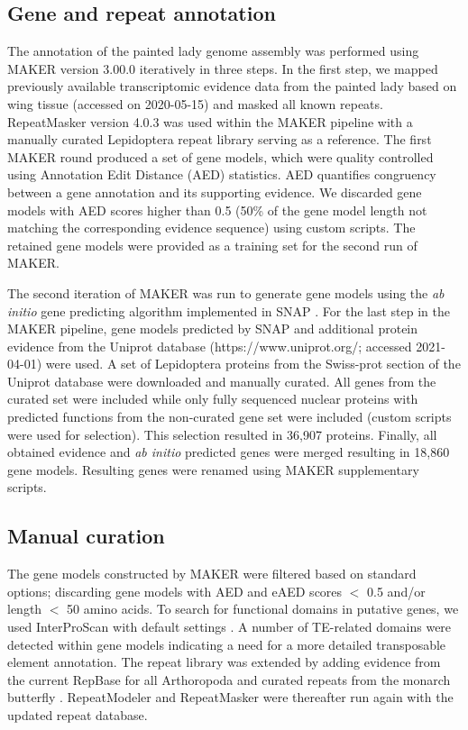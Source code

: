 \documentclass[twocolumn]{bmcart}%
\begin{document}
\subsection*{Gene and repeat annotation}
The annotation of the painted lady genome assembly was performed using MAKER version 3.00.0 \citep{holtMAKER2AnnotationPipeline2011} iteratively in three steps. In the first step, we mapped previously available transcriptomic evidence data from the painted lady based on wing tissue  \citep{connahsTranscriptomeAnalysisPainted2016a}(accessed on 2020-05-15) and masked all known repeats. RepeatMasker version 4.0.3 \citep{smitRepeatMaskerOpen42013} was used within the MAKER pipeline with a manually curated Lepidoptera repeat library  \citep{tallaRapidIncreaseGenome2017} serving as a reference. The first MAKER round produced a set of gene models, which were quality controlled using Annotation Edit Distance (AED) statistics. AED quantifies congruency between a gene annotation and its supporting evidence. We discarded gene models with AED scores higher than 0.5 (50\% of the gene model length not matching the corresponding evidence sequence) using custom scripts. The retained gene models were provided as a training set for the second run of MAKER.

The second iteration of MAKER was run to generate gene models using the \textit{ab initio} gene predicting algorithm implemented in SNAP \citep{korfGeneFindingNovel2004}. For the last step in the MAKER pipeline, gene models predicted by SNAP and additional protein evidence from the Uniprot database (https://www.uniprot.org/; accessed 2021-04-01) were used. A set of Lepidoptera proteins from the Swiss-prot section of the Uniprot database were downloaded and manually curated. All genes from the curated set were included while only fully sequenced nuclear proteins with predicted functions from the non-curated gene set were included (custom scripts were used for selection). This selection resulted in 36,907 proteins. Finally, all obtained evidence and \textit{ab initio} predicted genes were merged resulting in 18,860 gene models. Resulting genes were renamed using MAKER supplementary scripts.

\subsection*{Manual curation}  
The gene models constructed by MAKER were filtered based on standard options; discarding gene models with AED and eAED scores $<$ 0.5 and/or length $<$ 50 amino acids. To search for functional domains in putative genes, we used InterProScan with default settings \citep{jonesInterProScanGenomescaleProtein2014}. A number of TE-related domains were detected within gene models indicating a need for a more detailed transposable element annotation. The repeat library was extended by adding evidence from the current RepBase for all Arthoropoda \citep{baoRepbaseUpdateDatabase2015} and curated repeats from the monarch butterfly \citep{zhanMonarchBaseMonarchButterfly2013}. RepeatModeler and RepeatMasker \citep{holtMAKER2AnnotationPipeline2011} were thereafter run again with the updated repeat database.
\end{document}
